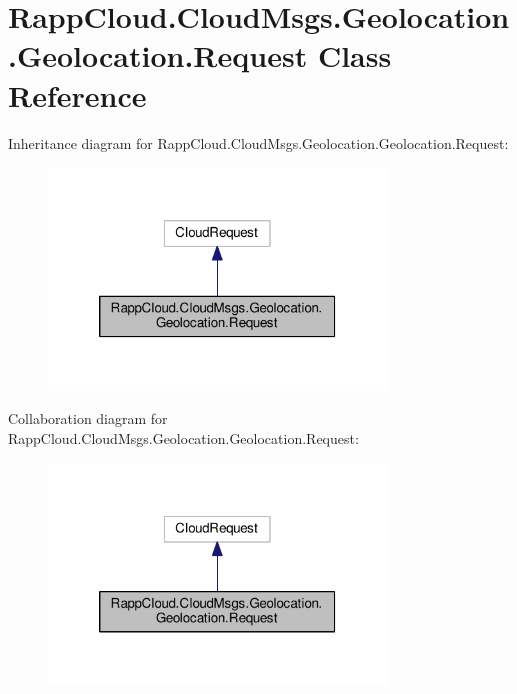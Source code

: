 \hypertarget{classRappCloud_1_1CloudMsgs_1_1Geolocation_1_1Geolocation_1_1Request}{\section{Rapp\-Cloud.\-Cloud\-Msgs.\-Geolocation.\-Geolocation.\-Request Class Reference}
\label{classRappCloud_1_1CloudMsgs_1_1Geolocation_1_1Geolocation_1_1Request}
}


Inheritance diagram for Rapp\-Cloud.\-Cloud\-Msgs.\-Geolocation.\-Geolocation.\-Request\-:
\nopagebreak
\begin{figure}[H]
\begin{center}
\leavevmode
\includegraphics[width=254pt]{classRappCloud_1_1CloudMsgs_1_1Geolocation_1_1Geolocation_1_1Request__inherit__graph}
\end{center}
\end{figure}


Collaboration diagram for Rapp\-Cloud.\-Cloud\-Msgs.\-Geolocation.\-Geolocation.\-Request\-:
\nopagebreak
\begin{figure}[H]
\begin{center}
\leavevmode
\includegraphics[width=254pt]{classRappCloud_1_1CloudMsgs_1_1Geolocation_1_1Geolocation_1_1Request__coll__graph}
\end{center}
\end{figure}
